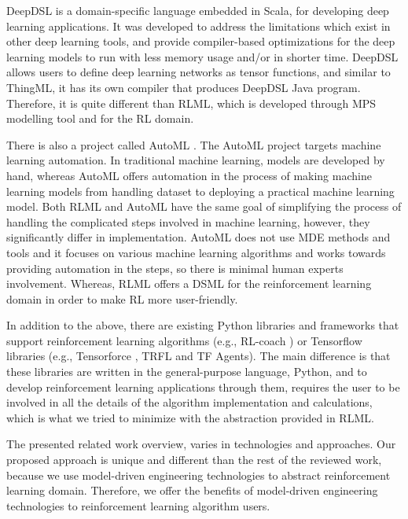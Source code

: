 \documentclass[11pt,letterpaper]{ryersonSGSThesis}
\begin{document}
\begin{ryersonSGSThesis}
    DeepDSL \cite{Zhao2017} is a domain-specific language embedded in Scala, for developing deep learning applications. It was developed to address the limitations which exist in other deep learning tools, and provide compiler-based optimizations for the deep learning models to run with less memory usage and/or in shorter time. DeepDSL allows users to define deep learning networks as tensor functions, and similar to ThingML, it has its own compiler that produces DeepDSL Java program. Therefore, it is quite different than RLML, which is developed through MPS modelling tool and for the RL domain.
    
    There is also a project called AutoML \cite{AutoML}. The AutoML \cite{AutoML} project targets machine learning automation. In traditional machine learning, models are developed by hand, whereas AutoML offers automation in the process of making machine learning models from handling dataset to deploying a practical machine learning model. Both RLML and AutoML have the same goal of simplifying the process of handling the complicated steps involved in machine learning, however, they significantly differ in implementation. AutoML does not use MDE methods and tools and it focuses on various machine learning algorithms and works towards providing automation in the steps, so there is minimal human experts involvement. Whereas, RLML offers a DSML for the reinforcement learning domain in order to make RL more user-friendly.
    
    In addition to the above, there are existing Python libraries and frameworks that support reinforcement learning algorithms (e.g., RL-coach \cite{RL-coach}) or Tensorflow libraries (e.g., Tensorforce \cite{tensorflow2015-whitepaper}, TRFL \cite{TRFL} and TF Agents\cite{TFAgents}). The main difference is that these libraries are written in the general-purpose language, Python, and to develop reinforcement learning applications through them, requires the user to be involved in all the details of the algorithm implementation and calculations, which is what we tried to minimize with the abstraction provided in RLML.
    
    The presented related work overview, varies in technologies and approaches. Our proposed approach is unique and different than the rest of the reviewed work, because we use model-driven engineering technologies to abstract reinforcement learning domain. Therefore, we offer the benefits of model-driven engineering technologies to reinforcement learning algorithm users.


\end{ryersonSGSThesis}
\end{document}
